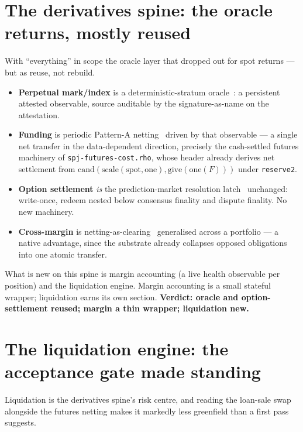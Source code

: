 \documentclass[11pt]{article}
\theoremstyle{definition}
\begin{document}
\section{The derivatives spine: the oracle returns, mostly reused}\label{sec:derivatives}

With ``everything'' in scope the oracle layer that dropped out for spot returns --- but as reuse, not
rebuild.

\begin{itemize}[leftmargin=1.4em]
\item \textbf{Perpetual mark/index} is a deterministic-stratum oracle~\cite[\S4.3]{predmkt}: a
persistent attested observable, source auditable by the signature-as-name on the attestation.
\item \textbf{Funding} is periodic Pattern-A netting~\cite[\S4.1]{finrho} driven by that observable ---
a single net transfer in the data-dependent direction, precisely the cash-settled futures machinery of
\texttt{spj-futures-cost.rho}, whose header already derives net settlement from
$\mathrm{cand}(\mathrm{scale}(\text{spot},\mathrm{one}), \mathrm{give}(\mathrm{one}(F)))$ under
\texttt{reserve2}.
\item \textbf{Option settlement} \emph{is} the prediction-market resolution latch~\cite[\S7]{predmkt}
unchanged: write-once, redeem nested below consensus finality and dispute finality. No new machinery.
\item \textbf{Cross-margin} is netting-as-clearing~\cite[\S2.3]{ppf} generalised across a portfolio ---
a native advantage, since the substrate already collapses opposed obligations into one atomic transfer.
\end{itemize}

\noindent
What is new on this spine is margin accounting (a live health observable per position) and the
liquidation engine. Margin accounting is a small stateful wrapper; liquidation earns its own section.
\textbf{Verdict: oracle and option-settlement reused; margin a thin wrapper; liquidation new.}

\section{The liquidation engine: the acceptance gate made standing}\label{sec:liquidation}

Liquidation is the derivatives spine's risk centre, and reading the loan-sale swap alongside the
futures netting makes it markedly less greenfield than a first pass suggests.
\end{document}
